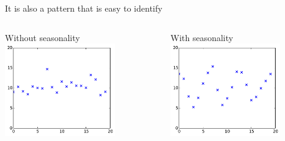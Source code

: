 \documentclass{beamer}
\begin{document}
\begin{frame}{}
 It is also a pattern that is easy to identify\\
\vspace{5mm}
\begin{columns}[c]
\column{5cm}
\begin{center}
Without seasonality
\includegraphics[height=4cm]{figures/2_seasonalno}
\end{center}
\column{5cm}
\begin{center}
With seasonality
\includegraphics[height=4cm]{figures/2_seasonal}
\end{center}
\end{columns}
\vspace{5mm}
\end{frame}
\end{document}
